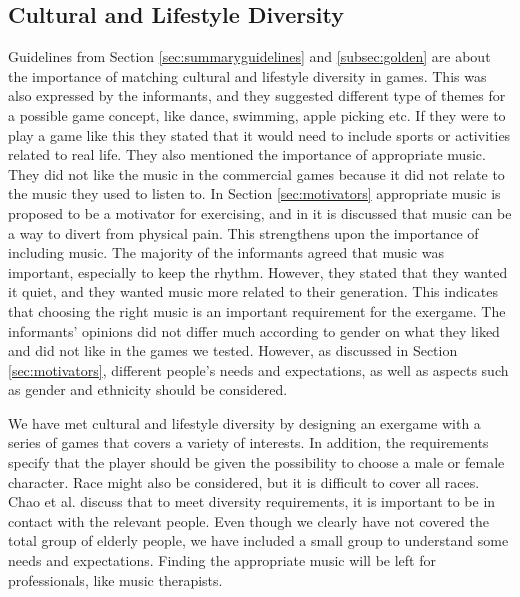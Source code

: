 \subsection{Cultural and Lifestyle Diversity}
Guidelines from Section \ref{sec:summaryguidelines} and \ref{subsec:golden} are about the importance of matching cultural and lifestyle diversity in games. This was also expressed by the informants, and they suggested different type of themes for a possible game concept, like dance, swimming, apple picking etc. If they were to play a game like this they stated that it would need to include sports or activities related to real life. They also mentioned the importance of appropriate music. They did not like the music in the commercial games because it did not relate to the music they used to listen to. In Section \ref{sec:motivators} appropriate music is proposed to be a motivator for exercising, and in \cite{schutzer} it is discussed that music can be a way to divert from physical pain. This strengthens upon the importance of including music. The majority of the informants agreed that music was important, especially to keep the rhythm. However, they stated that they wanted it quiet, and they wanted music more related to their generation. This indicates that choosing the right music is an important requirement for the exergame. The informants' opinions did not differ much according to gender on what they liked and did not like in the games we tested. However, as discussed in Section \ref{sec:motivators}, different people's needs and expectations, as well as aspects such as gender and ethnicity should be considered. 

We have met cultural and lifestyle diversity by designing an exergame with a series of games that covers a variety of interests. In addition, the requirements specify that the player should be given the possibility to choose a male or female character. Race might also be considered, but it is difficult to cover all races. Chao et al. \cite{chao} discuss that to meet diversity requirements, it is important to be in contact with the relevant people. Even though we clearly have not covered the total group of elderly people, we have included a small group to understand some needs and expectations. Finding the appropriate music will be left for professionals, like music therapists. 

